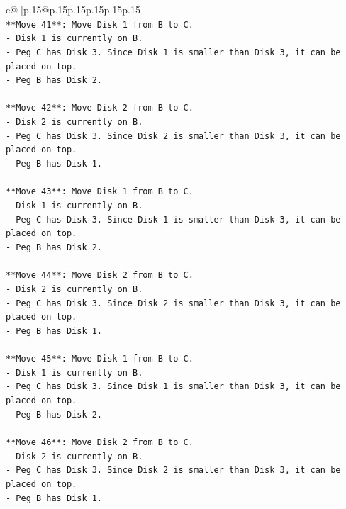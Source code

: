 \documentclass{article}
\begin{document}
{\begin{supertabular}{c@{$\;$}|p{.15\linewidth}@{}p{.15\linewidth}p{.15\linewidth}p{.15\linewidth}p{.15\linewidth}p{.15\linewidth}}
{{{\\ 
\texttt{**Move 41**: Move Disk 1 from B to C.} \\
\texttt{{-} Disk 1 is currently on B.} \\
\texttt{{-} Peg C has Disk 3. Since Disk 1 is smaller than Disk 3, it can be placed on top.} \\
\texttt{{-} Peg B has Disk 2.} \\
\\ 
\texttt{**Move 42**: Move Disk 2 from B to C.} \\
\texttt{{-} Disk 2 is currently on B.} \\
\texttt{{-} Peg C has Disk 3. Since Disk 2 is smaller than Disk 3, it can be placed on top.} \\
\texttt{{-} Peg B has Disk 1.} \\
\\ 
\texttt{**Move 43**: Move Disk 1 from B to C.} \\
\texttt{{-} Disk 1 is currently on B.} \\
\texttt{{-} Peg C has Disk 3. Since Disk 1 is smaller than Disk 3, it can be placed on top.} \\
\texttt{{-} Peg B has Disk 2.} \\
\\ 
\texttt{**Move 44**: Move Disk 2 from B to C.} \\
\texttt{{-} Disk 2 is currently on B.} \\
\texttt{{-} Peg C has Disk 3. Since Disk 2 is smaller than Disk 3, it can be placed on top.} \\
\texttt{{-} Peg B has Disk 1.} \\
\\ 
\texttt{**Move 45**: Move Disk 1 from B to C.} \\
\texttt{{-} Disk 1 is currently on B.} \\
\texttt{{-} Peg C has Disk 3. Since Disk 1 is smaller than Disk 3, it can be placed on top.} \\
\texttt{{-} Peg B has Disk 2.} \\
\\ 
\texttt{**Move 46**: Move Disk 2 from B to C.} \\
\texttt{{-} Disk 2 is currently on B.} \\
\texttt{{-} Peg C has Disk 3. Since Disk 2 is smaller than Disk 3, it can be placed on top.} \\
\texttt{{-} Peg B has Disk 1.} \\
\\ 
}}}
\end{supertabular}}
\end{document}
